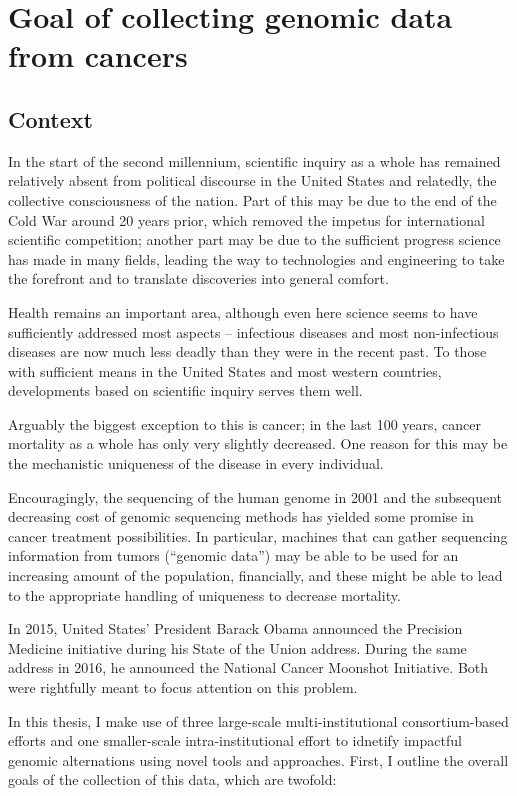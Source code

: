 \chapter{Goal of collecting genomic data from cancers}

\section{Context}
In the start of the second millennium, scientific inquiry as a whole
has remained relatively absent from political discourse in the United
States and relatedly,
the collective consciousness of the nation. Part of this may be due to
the end of the Cold War around 20 years prior, which removed the
impetus for international scientific competition; another part may be
due to the sufficient progress science has made in many fields,
leading the way to technologies and engineering to take the forefront
and to translate discoveries into general comfort.

Health remains an important area, although even here science seems to
have sufficiently addressed most aspects – infectious diseases and
most non-infectious diseases are now much less deadly than they were
in the recent past. To those with sufficient means in the United
States and most western countries, developments based on scientific
inquiry serves them well.

Arguably the biggest exception to this is cancer; in the last 100
years, cancer mortality as a whole has only very slightly
decreased. One reason for this may be the mechanistic uniqueness of
the disease in every individual.

Encouragingly, the sequencing of the human genome in 2001 and the
subsequent decreasing cost of genomic sequencing methods has yielded
some promise in cancer treatment possibilities. In particular,
machines that can gather sequencing information from tumors (“genomic
data”) may be able to be used for an increasing amount of the
population, financially, and these might be able to lead to the
appropriate handling of uniqueness to decrease mortality.

In 2015, United States’ President Barack Obama announced the Precision
Medicine initiative during his State of the Union address. During the
same address in 2016, he announced the National Cancer Moonshot
Initiative. Both were rightfully meant to focus attention on this
problem.

        In this thesis, I make use of
        three large-scale multi-institutional consortium-based efforts and one
        smaller-scale intra-institutional effort to idnetify impactful genomic
        alternations using novel tools and approaches. First, I
        outline the overall goals of the collection of this data,
        which are twofold: 


